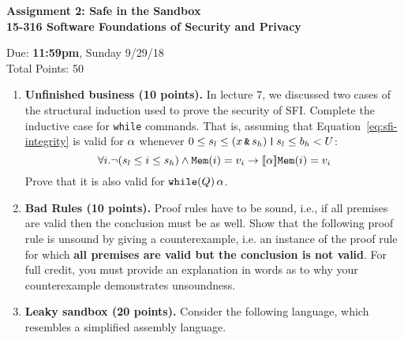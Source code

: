 \documentclass[10pt]{article}
\begin{document}
\begin{center}
\textbf{ Assignment 2: Safe in the Sandbox\\15-316 Software Foundations of Security and Privacy}\\
\end{center}
Due: \textbf{ 11:59pm}, Sunday 9/29/18 \\
Total Points: 50

\vspace{-5mm}

\begin{enumerate}
\item \textbf{Unfinished business (10 points).} In lecture 7, we discussed two cases of the structural induction used to prove the security of SFI. Complete the inductive case for \texttt{while} commands. That is, assuming that Equation~\ref{eq:sfi-integrity} is valid for $\alpha$ whenever $0 \le s_l \le  (x \operatorname{\texttt{\upshape \&}} s_h) \operatorname{\texttt{\upshape |}} s_l \le b_h < U$:
\begin{equation}
\label{eq:sfi-integrity}
\forall i . \lnot(s_l \le i \le s_h)  \land \pderef{i}=v_i \limply \dbox{\asprg}{\pderef{i}=v_i}
\end{equation}
Prove that it is also valid for $\texttt{\upshape while}(Q)\,\alpha$.


%


\item \textbf{Bad Rules (10 points).}
Proof rules have to be sound, i.e., if all premises are valid then the conclusion must be as well.
Show that the following proof rule is unsound by giving a counterexample, i.e. an instance of
the proof rule for which \textbf{all premises are valid but the conclusion is not valid}.
For full credit, you must provide an explanation in words as to why your counterexample demonstrates unsoundness.

{\linferenceRule[sequent] {
  \lsequent{\Gamma}{\dbox{\asprg}{\busfml}}
  &\lsequent{\Gamma,\busfml}{\dbox{\bsprg}{\ausfml}}
  } {
    \lsequent{\Gamma}{\dbox{\asprg;\bsprg}{\ausfml}}
  }
}{}


%


\item \textbf{Leaky sandbox (20 points).}
Consider the following language, which resembles a simplified assembly language.


\end{enumerate}
\end{document}
